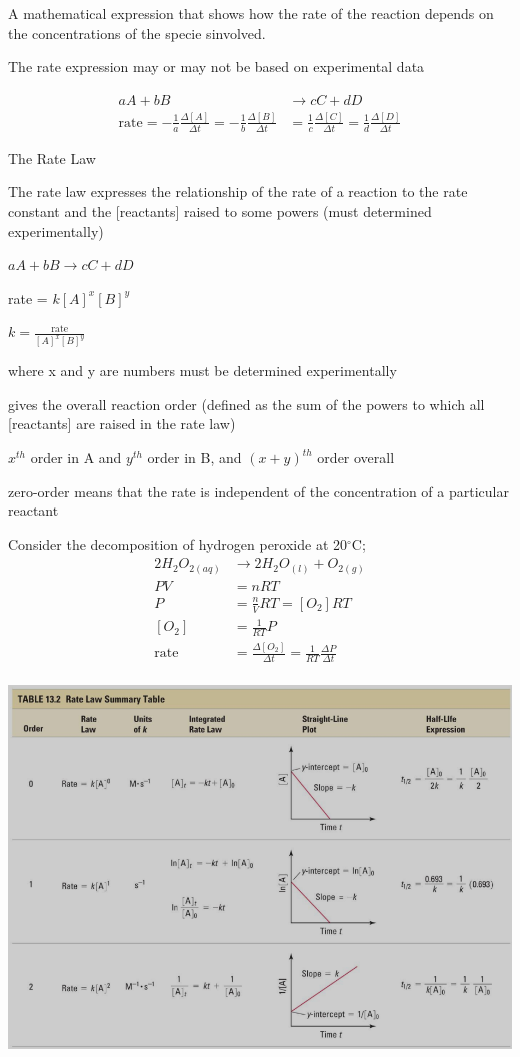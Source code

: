 \documentclass[11pt]{article}
\begin{document}
A mathematical expression that shows how the rate of the reaction depends on the concentrations of the specie sinvolved.

The rate expression may or may not be based on experimental data

\begin{align}
    aA + bB &\xrightarrow{} cC + dD \\
    \text{rate} = -\frac{1}{a}\frac{\Delta [A]}{\Delta t} = -\frac{1}{b}\frac{\Delta [B]}{\Delta t} &= \frac{1}{c}\frac{\Delta [C]}{\Delta t} = \frac{1}{d}\frac{\Delta [D]}{\Delta t} 
\end{align}

\noindent The Rate Law

The rate law expresses the relationship of the rate of a reaction to the rate constant and the [reactants] raised to some powers (must determined experimentally)

$aA+bB\xrightarrow{}cC+dD$

rate = $k[A]^x[B]^y$

$k = \frac{\text{rate}}{[A]^x[B]^y}$

where x and y are numbers must be determined experimentally 

gives the overall reaction order (defined as the sum of the powers to which all [reactants] are raised in the rate law)

$x^{th}$ order in A and $y^{th}$ order in B, and $(x+y)^{th}$ order overall

zero-order means that the rate is independent of the concentration of a particular reactant

\noindent Consider the decomposition of hydrogen peroxide at 20$^\circ$C;
\begin{align}
    2H_2O_{2(aq)} &\xrightarrow{} 2H_2O_{(l)} + O_{2(g)}\\
    PV&=nRT\\
    P&=\frac{n}{V}RT=[O_2]RT\\
    [O_2]&=\frac{1}{RT}P\\
    \text{rate}&=\frac{\Delta [O_2]}{\Delta t} = \frac{1}{RT}\frac{\Delta P}{\Delta t}\\
\end{align}

\includegraphics[scale=0.7]{ther2}
\end{document}
